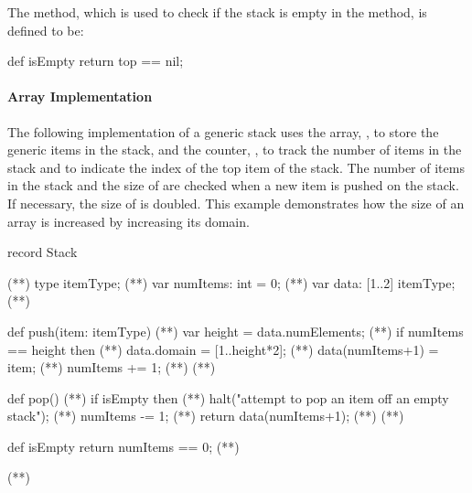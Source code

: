 The  method, which is used to check if the stack
is empty in the  method, is defined to be:
\begin{chapel}
  def isEmpty return top == nil;   
\end{chapel}

\paragraph{Array Implementation}
The following implementation of a generic stack uses the array,
, to store the generic items in the stack, and the
counter, , to track the
number of items in the stack and to indicate the index of
the top item of the stack.  The number of items in the stack
and the size of  are checked when a new item is pushed
on the stack.  If necessary, the size of  is doubled.
This example demonstrates how the size of an array is increased 
by increasing its domain.

\begin{numberedchapel}
record Stack {                     (*\label{stack_array_start}*)
  type itemType;                   (*\label{stack_array_itemtype}*)
  var numItems: int = 0;           (*\label{stack_array_numitems}*)
  var data: [1..2] itemType;       (*\label{stack_array_data}*)

  def push(item: itemType) {       (*\label{stack_array_push_start}*)
    var height = data.numElements;  (*\label{stack_array_push_height}*)
    if numItems == height then      (*\label{stack_array_push_check_height}*)
      data.domain = [1..height*2];  (*\label{stack_array_push_incr_dom}*)
    data(numItems+1) = item;        (*\label{stack_array_push_new_item}*)
    numItems += 1;                  (*\label{stack_array_push_num_incr}*)
  }                                 (*\label{stack_array_push_end}*)

  def pop() {                       (*\label{stack_array_pop_start}*)
    if isEmpty then                 (*\label{stack_array_pop_empty_1}*)
      halt("attempt to pop an item off an empty stack"); (*\label{stack_array_pop_empty_2}*)
    numItems -= 1;                  (*\label{stack_array_pop_num_dec}*)
    return data(numItems+1);        (*\label{stack_array_pop_return}*)
  }                                 (*\label{stack_array_pop_end}*)

  def isEmpty return numItems == 0; (*\label{stack_array_isempty}*)
}                                   (*\label{stack_array_end}*)
\end{numberedchapel}

